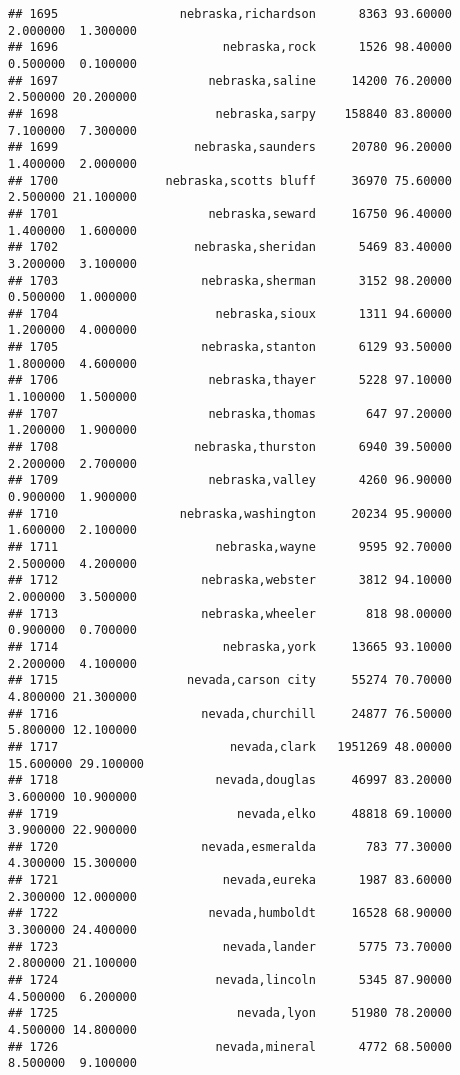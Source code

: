\documentclass[
]{article}
\begin{document}
\begin{verbatim}
## 1695                 nebraska,richardson      8363 93.60000  2.000000  1.300000
## 1696                       nebraska,rock      1526 98.40000  0.500000  0.100000
## 1697                     nebraska,saline     14200 76.20000  2.500000 20.200000
## 1698                      nebraska,sarpy    158840 83.80000  7.100000  7.300000
## 1699                   nebraska,saunders     20780 96.20000  1.400000  2.000000
## 1700               nebraska,scotts bluff     36970 75.60000  2.500000 21.100000
## 1701                     nebraska,seward     16750 96.40000  1.400000  1.600000
## 1702                   nebraska,sheridan      5469 83.40000  3.200000  3.100000
## 1703                    nebraska,sherman      3152 98.20000  0.500000  1.000000
## 1704                      nebraska,sioux      1311 94.60000  1.200000  4.000000
## 1705                    nebraska,stanton      6129 93.50000  1.800000  4.600000
## 1706                     nebraska,thayer      5228 97.10000  1.100000  1.500000
## 1707                     nebraska,thomas       647 97.20000  1.200000  1.900000
## 1708                   nebraska,thurston      6940 39.50000  2.200000  2.700000
## 1709                     nebraska,valley      4260 96.90000  0.900000  1.900000
## 1710                 nebraska,washington     20234 95.90000  1.600000  2.100000
## 1711                      nebraska,wayne      9595 92.70000  2.500000  4.200000
## 1712                    nebraska,webster      3812 94.10000  2.000000  3.500000
## 1713                    nebraska,wheeler       818 98.00000  0.900000  0.700000
## 1714                       nebraska,york     13665 93.10000  2.200000  4.100000
## 1715                  nevada,carson city     55274 70.70000  4.800000 21.300000
## 1716                    nevada,churchill     24877 76.50000  5.800000 12.100000
## 1717                        nevada,clark   1951269 48.00000 15.600000 29.100000
## 1718                      nevada,douglas     46997 83.20000  3.600000 10.900000
## 1719                         nevada,elko     48818 69.10000  3.900000 22.900000
## 1720                    nevada,esmeralda       783 77.30000  4.300000 15.300000
## 1721                       nevada,eureka      1987 83.60000  2.300000 12.000000
## 1722                     nevada,humboldt     16528 68.90000  3.300000 24.400000
## 1723                       nevada,lander      5775 73.70000  2.800000 21.100000
## 1724                      nevada,lincoln      5345 87.90000  4.500000  6.200000
## 1725                         nevada,lyon     51980 78.20000  4.500000 14.800000
## 1726                      nevada,mineral      4772 68.50000  8.500000  9.100000

\end{verbatim}
\end{document}
